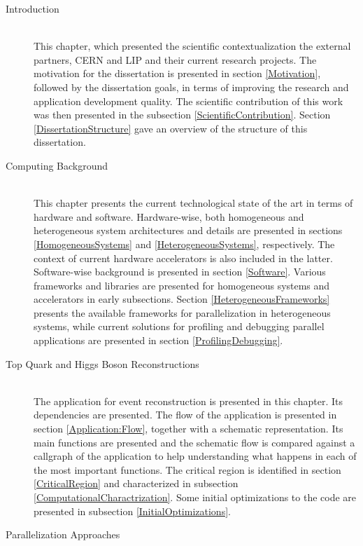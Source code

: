 \begin{description}
	\item[Introduction] \hfill \\
	This chapter, which presented the scientific contextualization the external partners, CERN and LIP and their current research projects. The motivation for the dissertation is presented in section \ref{Motivation}, followed by the dissertation goals, in terms of improving the research and application development quality. The scientific contribution of this work was then presented in the subsection \ref{ScientificContribution}. Section \ref{DissertationStructure} gave an overview of the structure of this dissertation.
	\item[Computing Background] \hfill \\
	This chapter presents the current technological state of the art in terms of hardware and software. Hardware-wise, both homogeneous and heterogeneous system architectures and details are presented in sections \ref{HomogeneousSystems} and \ref{HeterogeneousSystems}, respectively. The context of current hardware accelerators is also included in the latter. Software-wise background is presented in section \ref{Software}. Various frameworks and libraries are presented for homogeneous systems and accelerators in early subsections. Section \ref{HeterogeneousFrameworks} presents the available frameworks for parallelization in heterogeneous systems, while current solutions for profiling and debugging parallel applications are presented in section \ref{ProfilingDebugging}.
	\item[Top Quark and Higgs Boson Reconstructions] \hfill \\
	The \tth application for event reconstruction is presented in this chapter. Its dependencies are presented. The flow of the application is presented in section \ref{Application:Flow}, together with a schematic representation. Its main functions are presented and the schematic flow is compared against a callgraph of the application to help understanding what happens in each of the most important functions. The critical region is identified in section \ref{CriticalRegion} and characterized in subsection \ref{ComputationalCharactrization}. Some initial optimizations to the code are presented in subsection \ref{InitialOptimizations}.
	\item[Parallelization Approaches] \hfill \\

\end{description}
